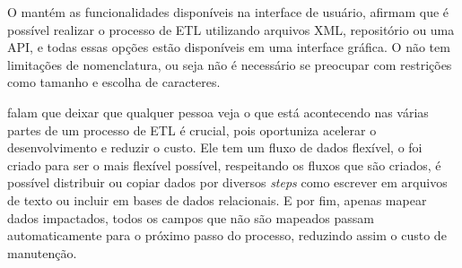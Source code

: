 O \pdi mantém as funcionalidades disponíveis na interface de usuário,  afirmam que é possível realizar o processo de ETL utilizando arquivos XML, repositório ou uma API, e todas essas opções estão disponíveis em uma interface gráfica. O \pdi não tem limitações de nomenclatura, ou seja não é necessário se preocupar com restrições como tamanho e escolha de caracteres.

 falam que deixar que qualquer pessoa veja o que está acontecendo nas várias partes de um processo de ETL é crucial, pois oportuniza acelerar o desenvolvimento e reduzir o custo. Ele tem um fluxo de dados flexível, o \pdi foi criado para ser o mais flexível possível, respeitando os fluxos que são criados, é possível distribuir ou copiar dados por diversos \textit{steps} como escrever em arquivos de texto ou incluir em bases de dados relacionais. E por fim, apenas mapear dados impactados, todos os campos que não são mapeados passam automaticamente para o próximo passo do processo, reduzindo assim o custo de manutenção.

